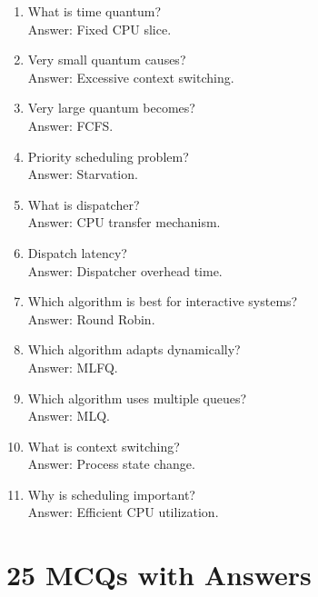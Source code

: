 \begin{enumerate}
\item What is time quantum?\\
Answer: Fixed CPU slice.

\item Very small quantum causes?\\
Answer: Excessive context switching.

\item Very large quantum becomes?\\
Answer: FCFS.

\item Priority scheduling problem?\\
Answer: Starvation.

\item What is dispatcher?\\
Answer: CPU transfer mechanism.

\item Dispatch latency?\\
Answer: Dispatcher overhead time.

\item Which algorithm is best for interactive systems?\\
Answer: Round Robin.

\item Which algorithm adapts dynamically?\\
Answer: MLFQ.

\item Which algorithm uses multiple queues?\\
Answer: MLQ.

\item What is context switching?\\
Answer: Process state change.

\item Why is scheduling important?\\
Answer: Efficient CPU utilization.
\end{enumerate}

\section{25 MCQs with Answers}

